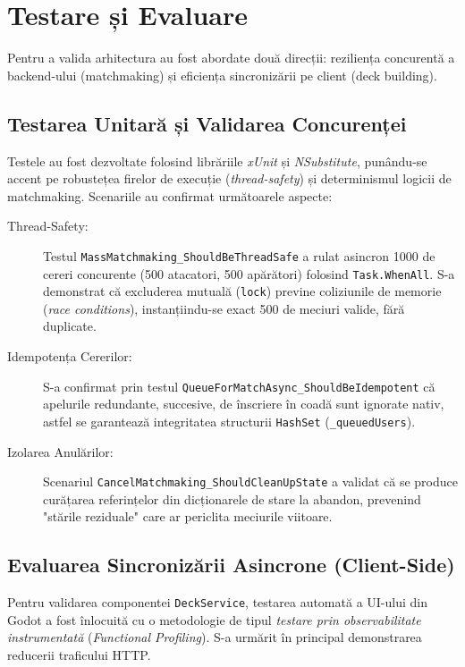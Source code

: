 \chapter{Testare și Evaluare}
\label{ch:testare}

Pentru a valida arhitectura au fost abordate două direcții: reziliența concurentă a backend-ului (matchmaking) și eficiența sincronizării pe client (deck building).


\section{Testarea Unitară și Validarea Concurenței}
Testele au fost dezvoltate folosind librăriile \textit{xUnit} și \textit{NSubstitute}, punându-se accent pe robustețea firelor de execuție (\textit{thread-safety}) și determinismul logicii de matchmaking. Scenariile au confirmat următoarele aspecte:

\begin{description}
    \item[Thread-Safety:] Testul \texttt{MassMatchmaking\_ShouldBeThreadSafe} a rulat asincron 1000 de cereri concurente (500 atacatori, 500 apărători) folosind \texttt{Task.WhenAll}. S-a demonstrat că excluderea mutuală (\texttt{lock}) previne coliziunile de memorie (\textit{race conditions}), instanțiindu-se exact 500 de meciuri valide, fără duplicate.

    \item[Idempotența Cererilor:] S-a confirmat prin testul \texttt{QueueForMatchAsync\_ShouldBeIdempotent} că apelurile redundante, succesive, de înscriere în coadă sunt ignorate nativ, astfel se garantează integritatea structurii \texttt{HashSet} (\texttt{\_queuedUsers}).

    \item[Izolarea Anulărilor:] Scenariul \texttt{CancelMatchmaking\_ShouldCleanUpState} a validat că se produce curățarea referințelor din dicționarele de stare la abandon, prevenind "stările reziduale" care ar periclita meciurile viitoare.
\end{description}



\section{Evaluarea Sincronizării Asincrone (Client-Side)}
Pentru validarea componentei \texttt{DeckService}, testarea automată a UI-ului din Godot a fost înlocuită cu o metodologie de tipul \textit{testare prin observabilitate instrumentată} (\textit{Functional Profiling}). S-a urmărit în principal demonstrarea reducerii traficului HTTP.

